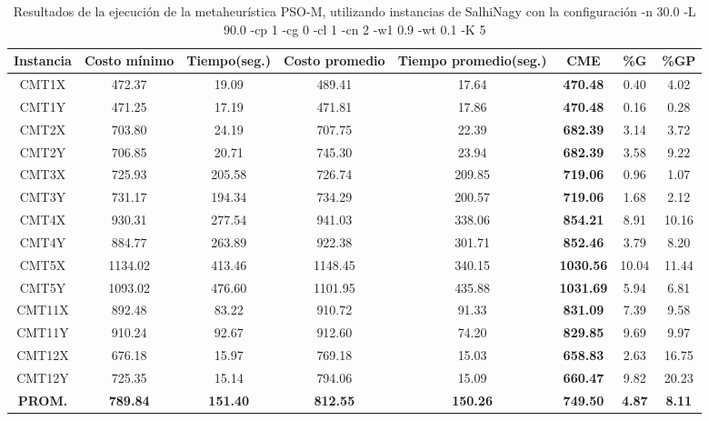\begin{table}[h]
\caption{Resultados de la ejecución de la metaheurística PSO-M, utilizando instancias de SalhiNagy con la configuración -n 30.0 -L 90.0 -cp 1 -cg 0 -cl 1 -cn 2 -w1 0.9 -wt 0.1 -K 5}
\centering
\small
\begin{tabular}{c c c c c c c c}
\hline\hline
Instancia & Costo mínimo & Tiempo(seg.) & Costo promedio & Tiempo promedio(seg.) & CME & \%G & \%GP \\ [0.5ex]
\hline
CMT1X & 472.37 & 19.09 & 
489.41 & 17.64 & \bf{470.48} & 
0.40 & 4.02\\CMT1Y & 471.25 & 17.19 & 
471.81 & 17.86 & \bf{470.48} & 
0.16 & 0.28\\CMT2X & 703.80 & 24.19 & 
707.75 & 22.39 & \bf{682.39} & 
3.14 & 3.72\\CMT2Y & 706.85 & 20.71 & 
745.30 & 23.94 & \bf{682.39} & 
3.58 & 9.22\\CMT3X & 725.93 & 205.58 & 
726.74 & 209.85 & \bf{719.06} & 
0.96 & 1.07\\CMT3Y & 731.17 & 194.34 & 
734.29 & 200.57 & \bf{719.06} & 
1.68 & 2.12\\CMT4X & 930.31 & 277.54 & 
941.03 & 338.06 & \bf{854.21} & 
8.91 & 10.16\\CMT4Y & 884.77 & 263.89 & 
922.38 & 301.71 & \bf{852.46} & 
3.79 & 8.20\\CMT5X & 1134.02 & 413.46 & 
1148.45 & 340.15 & \bf{1030.56} & 
10.04 & 11.44\\CMT5Y & 1093.02 & 476.60 & 
1101.95 & 435.88 & \bf{1031.69} & 
5.94 & 6.81\\CMT11X & 892.48 & 83.22 & 
910.72 & 91.33 & \bf{831.09} & 
7.39 & 9.58\\CMT11Y & 910.24 & 92.67 & 
912.60 & 74.20 & \bf{829.85} & 
9.69 & 9.97\\CMT12X & 676.18 & 15.97 & 
769.18 & 15.03 & \bf{658.83} & 
2.63 & 16.75\\CMT12Y & 725.35 & 15.14 & 
794.06 & 15.09 & \bf{660.47} & 
9.82 & 20.23\\\bf{PROM.} & 
\bf{789.84} & \bf{151.40} & \bf{812.55} & \bf{150.26} & \bf{749.50} & \bf{4.87} & \bf{8.11}\\[1ex]\hline
\end{tabular}
\label{table:nonlin}
\end{table}
